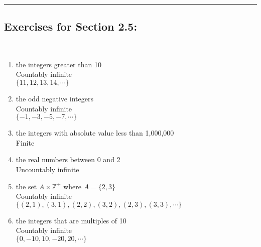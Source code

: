 \documentclass[12pt]{article}  %
\begin{document}
\rule{6in}{.1pt}       %




\subsection*{Exercises for Section 2.5:}     

\\
\begin{enumerate}
    \item the integers greater than 10\\
    Countably infinite\\
    $\{11,12,13,14,\cdots\}$
    
    \item the odd negative integers\\
    Countably infinite\\
    $\{-1,-3,-5,-7,\cdots\}$
    
    \item the integers with absolute value less than 1,000,000\\
    Finite
    
    \item the real numbers between 0 and 2\\
    Uncountably infinite
    
    \item the set $A\times\mathbb{Z}^+$ where $A=\{2,3\}$\\
    Countably infinite\\
    $\{(2,1),(3,1),(2,2),(3,2),(2,3),(3,3),\cdots\}$
    
    \item the integers that are multiples of 10\\
    Countably infinite\\
    $\{0,-10,10,-20,20,\cdots\}$
\end{enumerate}
\end{document}
